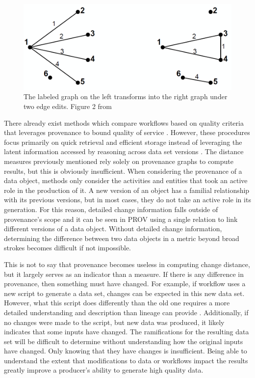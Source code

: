 \begin{figure}
	\centering
	\includegraphics[scale=0.40]{figures/GraphEdit.png}
	\caption{The labeled graph on the left transforms into the right graph under two edge edits. Figure 2 from \cite{Goddard:1996:DGU:246962.246972}}
	\label{GraphEdit}
\end{figure}

There already exist methods which compare workflows based on quality criteria that leverages provenance to bound quality of service \cite{2015:CAA:2778374.2778504}.
However, these procedures focus primarily on quick retrieval and efficient storage instead of leveraging the latent information accessed by reasoning across data set versions \cite{tan2004research}.
The distance measures previously mentioned rely solely on provenance graphs to compute results, but this is obviously insufficient.
When considering the provenance of a data object, methods only consider the activities and entities that took an active role in the production of it.
A new version of an object has a familial relationship with its previous versions, but in most cases, they do not take an active role in its generation.
For this reason, detailed change information falls outside of provenance's scope and it can be seen in PROV using a single relation to link different versions of a data object.
Without detailed change information, determining the difference between two data objects in a metric beyond broad strokes becomes difficult if not impossible.

This is not to say that provenance becomes useless in computing change distance, but it largely serves as an indicator than a measure.
If there is any difference in provenance, then something must have changed.
For example, if workflow uses a new script to generate a data set, changes can be expected in this new data set.
However, what this script does differently than the old one requires a more detailed understanding and description than lineage can provide  \cite{Bose:2005:LRS:1057977.1057978}.
Additionally, if no changes were made to the script, but new data was produced, it likely indicates that some inputs have changed.
The ramifications for the resulting data set will be difficult to determine without understanding how the original inputs have changed.
Only knowing that they have changes is insufficient.
Being able to understand the extent that modifications to data or workflows impact the results greatly improve a producer's ability to generate high quality data.

